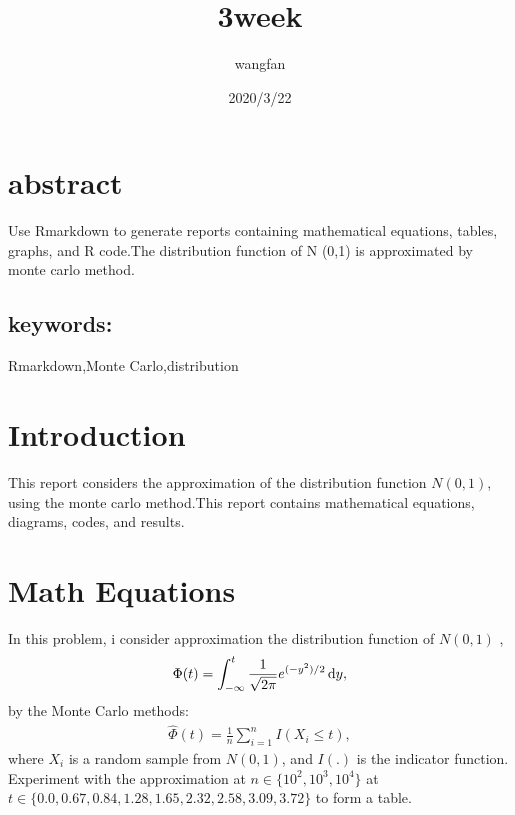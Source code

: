 \documentclass[
]{article}
\title{3week}
\author{wangfan}
\date{2020/3/22}
\begin{document}
\maketitle

{
\setcounter{tocdepth}{2}
\tableofcontents
}
\hypertarget{abstract}{%
\section{abstract}\label{abstract}}

Use Rmarkdown to generate reports containing mathematical equations,
tables, graphs, and R code.The distribution function of N (0,1) is
approximated by monte carlo method.

\hypertarget{keywords}{%
\subsection{keywords:}\label{keywords}}

Rmarkdown,Monte Carlo,distribution

\hypertarget{introduction}{%
\section{Introduction}\label{introduction}}

This report considers the approximation of the distribution function
\(N(0, 1)\), using the monte carlo method.This report contains
mathematical equations, diagrams, codes, and results.

\hypertarget{math-equations}{%
\section{Math Equations}\label{math-equations}}

In this problem, i consider approximation the distribution function of
\(N(0,1)\) , \begin{align}
    \Phi(t) = \int_{-\infty}^t\frac{1}{\sqrt{{2\pi}}}e^
     {(-y^2)/2} \,{\rm d}y,
\end{align} by the Monte Carlo methods: \begin{align}
    \hat{\Phi}(t) = \frac{1}{n}\sum_{i=1}^n I(X_i \leq t),
\end{align} where \(X_i\) is a random sample from \(N(0,1)\), and
\(I(.)\) is the indicator function. Experiment with the approximation at
\(n \in \{10^2, 10^3, 10^4\}\) at
\(t \in \{0.0, 0.67, 0.84, 1.28, 1.65, 2.32, 2.58, 3.09, 3.72\}\) to
form a table.
\end{document}
